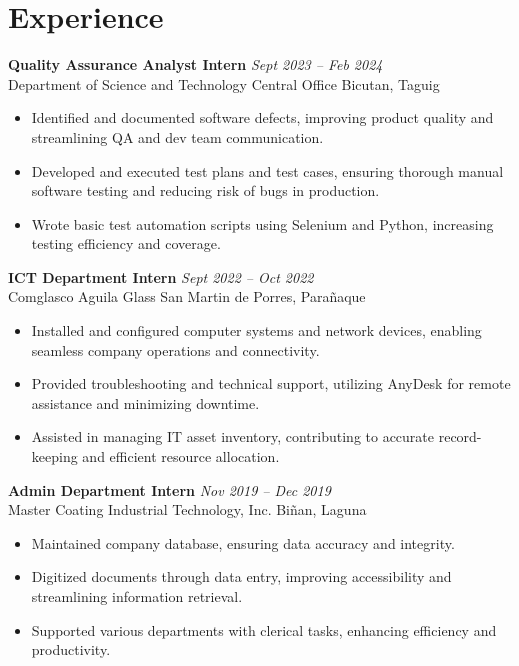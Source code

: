 \documentclass[a4paper, 10pt]{article}
\begin{document}
\section*{Experience}
\noindent \textbf{Quality Assurance Analyst Intern} \hfill \textit{Sept 2023 – Feb 2024} \\
Department of Science and Technology Central Office \hfill Bicutan, Taguig
\begin{itemize}[leftmargin=0.5in]
  \item Identified and documented software defects, improving product quality and streamlining QA and dev team communication.
  \item Developed and executed test plans and test cases, ensuring thorough manual software testing and reducing risk of bugs in production.
  \item Wrote basic test automation scripts using Selenium and Python, increasing testing efficiency and coverage.
\end{itemize}
\noindent \textbf{ICT Department Intern} \hfill \textit{Sept 2022 – Oct 2022} \\
Comglasco Aguila Glass \hfill San Martin de Porres, Parañaque
\begin{itemize}[leftmargin=0.5in]
  \item Installed and configured computer systems and network devices, enabling seamless company operations and connectivity.
  \item Provided troubleshooting and technical support, utilizing AnyDesk for remote assistance and minimizing downtime.
  \item Assisted in managing IT asset inventory, contributing to accurate record-keeping and efficient resource allocation.
\end{itemize}
\noindent \textbf{Admin Department Intern} \hfill \textit{Nov 2019 – Dec 2019} \\
Master Coating Industrial Technology, Inc. \hfill Biñan, Laguna
\begin{itemize}[leftmargin=0.5in]
  \item Maintained company database, ensuring data accuracy and integrity.
  \item Digitized documents through data entry, improving accessibility and streamlining information retrieval.
  \item Supported various departments with clerical tasks, enhancing efficiency and productivity.
\end{itemize}

\vspace{-1em}
\end{document}
